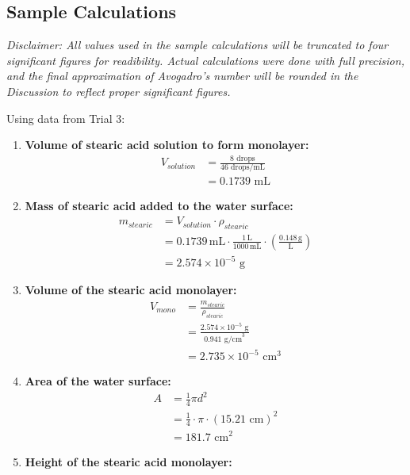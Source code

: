 \documentclass[11pt]{article}
\begin{document}
\subsection*{Sample Calculations}
{\small\textit{Disclaimer: All values used in the sample calculations will be truncated to four significant figures for readibility. Actual calculations were done with full precision,
and the final approximation of Avogadro's number will be rounded in the Discussion to reflect proper significant figures.}} 

Using data from Trial 3:

\begin{enumerate}[label=\arabic*.]
    \item \textbf{Volume of stearic acid solution to form monolayer:}
    \begin{align*}
        V_{solution} &= \frac{8 \text{ drops}}{46 \text{ drops/mL}} \\
        &= 0.1739 \text{ mL}
    \end{align*}
    \item \textbf{Mass of stearic acid added to the water surface:}
    \begin{align*}
        m_{stearic} &= V_{solution} \cdot \rho_{stearic} \\
        &= 0.1739\,\text{mL} \cdot \frac{1\,\text{L}}{1000\,\text{mL}} \cdot \left(\tfrac{0.148\,\text{g}}{\text{L}}\right) \\
        &= 2.574 \times 10^{-5} \text{ g}
    \end{align*}
    \item \textbf{Volume of the stearic acid monolayer:} 
    \begin{align*} 
        V_{mono} &= \frac{m_{stearic}}{\rho_{stearic}} \\[0.5em]   %
        &= \frac{2.574 \times 10^{-5} \text{ g}}{0.941 \text{ g/cm}^3} \\
        &= 2.735 \times 10^{-5} \text{ cm}^3
    \end{align*}
    \item \textbf{Area of the water surface:}
    \begin{align*}
        A &= \frac{1}{4} \pi d^2 \\[0.5em]
        &= \frac{1}{4} \cdot \pi \cdot (15.21 \text{ cm})^2 \\[0.5em]
        &= 181.7 \text{ cm}^2 
    \end{align*}
    \item \textbf{Height of the stearic acid monolayer:}

\end{enumerate}
\end{document}
